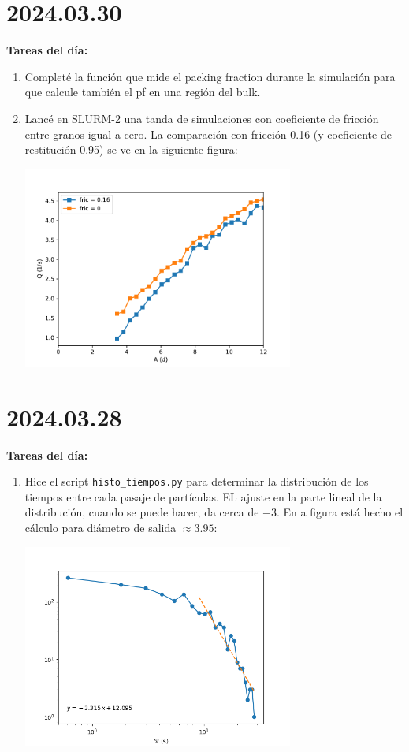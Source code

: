 \documentclass[11pt]{article}
\begin{document}
\section*{2024.03.30}
\textbf{Tareas del día:}
\begin{enumerate}
\item Completé la función que mide el packing fraction durante la simulación para que calcule
    también el pf en una región del bulk.
\item Lancé en SLURM-2 una tanda de simulaciones con coeficiente de fricción entre granos
    igual a cero. La comparación con fricción 0.16 (y coeficiente de restitución 0.95)
    se ve en la siguiente figura:
        \begin{center}
          \includegraphics[width=0.7\textwidth]{figs/q_r_fric.pdf}
        \end{center}
\end{enumerate}


\section*{2024.03.28}
\textbf{Tareas del día:}
\begin{enumerate}
\item Hice el script \texttt{histo\_tiempos.py} para determinar la distribución de los tiempos
    entre cada pasaje de partículas. EL ajuste en la parte lineal de la distribución,
    cuando se puede hacer, da cerca de $-3$. En a figura está hecho el cálculo para
    diámetro de salida $\approx 3.95$:
    \begin{center}
      \includegraphics[width=0.7\textwidth]{figs/histo-dt.png}
    \end{center}
\end{enumerate}
\end{document}
